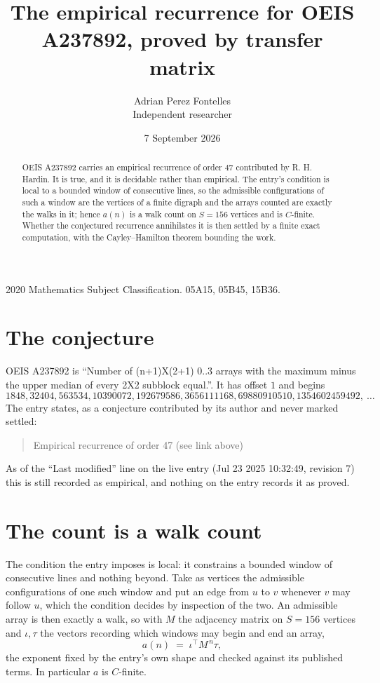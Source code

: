 \documentclass[11pt,a4paper]{article}
\title{The empirical recurrence for OEIS A237892, proved by transfer matrix}
\author{Adrian Perez Fontelles\\ \small Independent researcher}
\date{7 September 2026}
\theoremstyle{plain}
\theoremstyle{definition}
\begin{document}
\maketitle

\begin{abstract}
OEIS A237892 carries an empirical recurrence of order $47$ contributed by R. H. Hardin. It is
true, and it is decidable rather than empirical. The entry's condition is local to a bounded window of consecutive lines, so
the admissible configurations of such a window are the vertices of a finite digraph and the
arrays counted are exactly the walks in it; hence $a(n)$ is a walk count on $S=156$ vertices
and is $C$-finite. Whether the conjectured recurrence annihilates it is then settled by a
finite exact computation, with the Cayley--Hamilton theorem bounding the work.
\end{abstract}

\noindent\small 2020 Mathematics Subject Classification. 05A15, 05B45, 15B36.\normalsize

\section{The conjecture}

OEIS A237892 is ``Number of (n+1)X(2+1) 0..3 arrays with the maximum minus the upper median of every 2X2 subblock equal.''. It has offset $1$ and begins
\[
1848, 32404, 563534, 10390072, 192679586, 3656111168, 69880910510, 1354602459492,\ \dots
\]
The entry states, as a conjecture contributed by its author and never marked settled:
\begin{quote}
Empirical recurrence of order 47 (see link above)
\end{quote}
As of the ``Last modified'' line on the live entry (Jul 23 2025 10:32:49, revision 7) this is still
recorded as empirical, and nothing on the entry records it as proved.

\section{The count is a walk count}

The condition the entry imposes is local: it constrains a bounded window of consecutive lines and nothing beyond. Take as
vertices the admissible configurations of one such window and put an edge from $u$ to $v$
whenever $v$ may follow $u$, which the condition decides by inspection of the two. An
admissible array is then exactly a walk, so with $M$ the adjacency matrix on $S=156$ vertices
and $\iota,\tau$ the vectors recording which windows may begin and end an array,
\[
a(n)\;=\;\iota^{\!\top}M^{\,n}\tau ,
\]
the exponent fixed by the entry's own shape and checked against its published terms. In
particular $a$ is $C$-finite.
\end{document}
